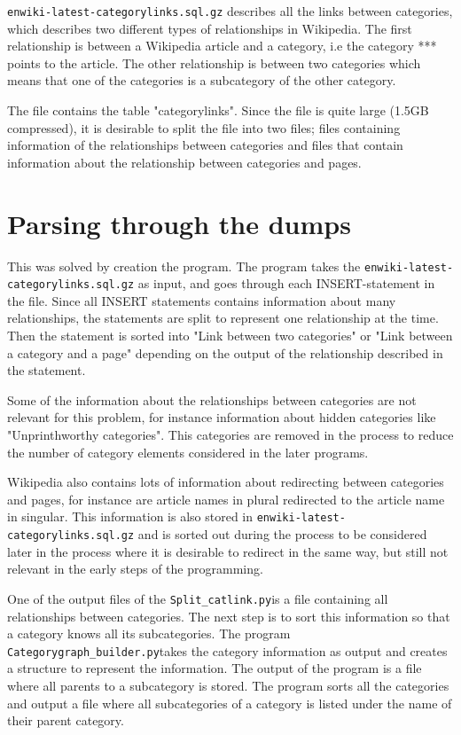 \documentclass[english,a4paper]{ifimaster}
\newcommand{\enwikicatlink}{\texttt{enwiki-latest-categorylinks.sql.gz} }
\newcommand{\catlinkprogram}{\texttt{Split\_catlink.py}}
\newcommand{\catgraphbuilderprogram}{\texttt{Categorygraph\_builder.py}}
\begin{document}
\enwikicatlink describes all the links between categories, which describes two different types of relationships in Wikipedia. The first relationship is between a Wikipedia article and a category, i.e the category *** points to the article. The other relationship is between two categories which means that one of the categories is a subcategory of the other category. 

The file contains the table "categorylinks". Since the file is quite large (1.5GB compressed), it is desirable to split the file into two files; files containing information of the relationships between categories and files that contain information about the relationship between categories and pages. 


\chapter{Parsing through the dumps}
This was solved by creation the program. The program takes the \enwikicatlink as input, and goes through each INSERT-statement in the file. Since all INSERT statements contains information about many relationships, the statements are split to represent one relationship at the time. Then the statement is sorted into "Link between two categories" or "Link between a category and a page" depending on the output of the relationship described in the statement. 

Some of the information about the relationships between categories are not relevant for this problem, for instance information about hidden categories like "Unprinthworthy categories". This categories are removed in the process to reduce the number of category elements considered in the later programs. 

Wikipedia also contains lots of information about redirecting between categories and pages, for instance are article names in plural redirected to the article name in singular.  This information is also stored in \enwikicatlink and is sorted out during the process to be considered later in the process where it is desirable to redirect in the same way, but still not relevant in the early steps of the programming. 

One of the output files of the \catlinkprogram is a file containing all relationships between categories. The next step is to sort this information so that a category knows all its subcategories. The program \catgraphbuilderprogram takes the category information as output and creates a structure to represent the information. The output of the program is a file where all parents to a subcategory is stored. %
The program sorts all the categories and output a file where all subcategories of a category is listed under the name of their parent category.
\end{document}
